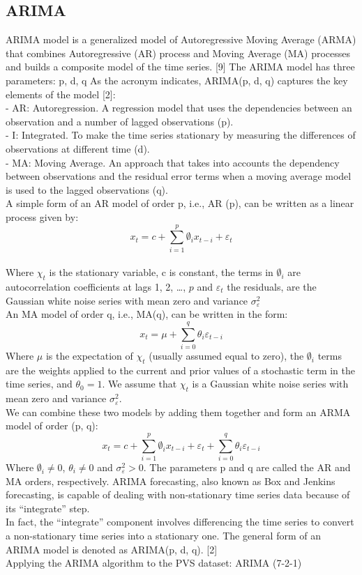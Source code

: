 \documentclass{ieeeojies}
\begin{document}
\subsection{ARIMA}
ARIMA model is a generalized model of Autoregressive
Moving Average (ARMA) that combines Autoregressive
(AR) process and Moving Average (MA) processes and
builds a composite model of the time series. [9]
The ARIMA model has three parameters: p, d, q
As the acronym indicates, ARIMA(p, d, q) captures the key
elements of the model [2]: \\
- AR: Autoregression. A regression model that uses the
dependencies between an observation and a number of
lagged observations (p). \\
- I: Integrated. To make the time series stationary by
measuring the differences of observations at different
time (d). \\
- MA: Moving Average. An approach that takes into
accounts the dependency between observations and the
residual error terms when a moving average model is
used to the lagged observations (q). \\
A simple form of an AR model of order p, i.e., AR (p), can
be written as a linear process given by: \\
$$
x_t=c+\sum_{i=1}^p \emptyset_i x_{t-i}+\varepsilon_t
$$
\\
Where $\chi_t$ is the stationary variable, c is constant, the terms in $\emptyset_i$ are autocorrelation coefficients at lags 1, 2, …, $p$ and $\varepsilon_t$ the residuals, are the Gaussian white noise series with mean zero and variance $\sigma_{\varepsilon}^2$ \\ 
An MA model of order q, i.e., MA(q), can be written in the form:
$$
x_t=\mu+\sum_{i=0}^q \theta_i \varepsilon_{t-i}
$$
Where $\mu$ is the expectation of $\chi_t$ (usually assumed equal to zero), the $\emptyset_i$ terms are the weights applied to the current and
prior values of a stochastic term in the time series, and $\theta_0=1$. We assume that $\chi_t$ is a Gaussian white noise series with
mean zero and variance $\sigma_{\varepsilon}^2$. \\ 
We can combine these two models by adding them together
and form an ARMA model of order (p, q):
$$
x_t=c +\sum_{i=1}^p \emptyset_i x_{t-i}+\varepsilon_t + \sum_{i=0}^q \theta_i \varepsilon_{t-i}
$$
Where $\emptyset_i \neq 0$, $\theta_i \neq 0$ and  $\sigma_{\varepsilon}^2 > 0$. The parameters p and q are
called the AR and MA orders, respectively. ARIMA
forecasting, also known as Box and Jenkins forecasting, is
capable of dealing with non-stationary time series data
because of its “integrate” step. \\
In fact, the “integrate” component involves differencing the
time series to convert a non-stationary time series into a
stationary one. The general form of an ARIMA model is denoted
as ARIMA(p, d, q). [2] \\
Applying the ARIMA algorithm to the PVS dataset:
ARIMA (7-2-1) \\
\end{document}
